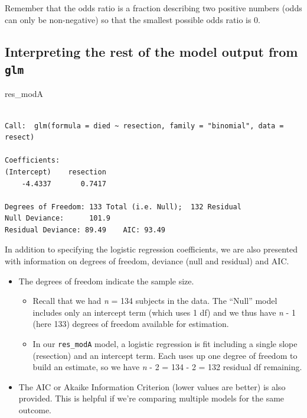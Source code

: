 \documentclass[]{book}
\newenvironment{Shaded}{\begin{snugshade}}{\end{snugshade}}
\newcommand{\NormalTok}[1]{#1}
\providecommand{\tightlist}{%
  \setlength{\itemsep}{0pt}\setlength{\parskip}{0pt}}
\theoremstyle{definition}
\theoremstyle{definition}
\theoremstyle{definition}
\theoremstyle{remark}
\begin{document}
Remember that the odds ratio is a fraction describing two positive
numbers (odds can only be non-negative) so that the smallest possible
odds ratio is 0.

\subsection{\texorpdfstring{Interpreting the rest of the model output
from
\texttt{glm}}{Interpreting the rest of the model output from glm}}\label{interpreting-the-rest-of-the-model-output-from-glm}

\begin{Shaded}
\begin{Highlighting}[]
\NormalTok{res_modA}
\end{Highlighting}
\end{Shaded}

\begin{verbatim}

Call:  glm(formula = died ~ resection, family = "binomial", data = resect)

Coefficients:
(Intercept)    resection  
    -4.4337       0.7417  

Degrees of Freedom: 133 Total (i.e. Null);  132 Residual
Null Deviance:      101.9 
Residual Deviance: 89.49    AIC: 93.49
\end{verbatim}

In addition to specifying the logistic regression coefficients, we are
also presented with information on degrees of freedom, deviance (null
and residual) and AIC.

\begin{itemize}
\tightlist
\item
  The degrees of freedom indicate the sample size.

  \begin{itemize}
  \tightlist
  \item
    Recall that we had \emph{n} = 134 subjects in the data. The ``Null''
    model includes only an intercept term (which uses 1 df) and we thus
    have \emph{n} - 1 (here 133) degrees of freedom available for
    estimation.
  \item
    In our \texttt{res\_modA} model, a logistic regression is fit
    including a single slope (resection) and an intercept term. Each
    uses up one degree of freedom to build an estimate, so we have
    \emph{n} - 2 = 134 - 2 = 132 residual df remaining.
  \end{itemize}
\item
  The AIC or Akaike Information Criterion (lower values are better) is
  also provided. This is helpful if we're comparing multiple models for
  the same outcome.
\end{itemize}
\end{document}
